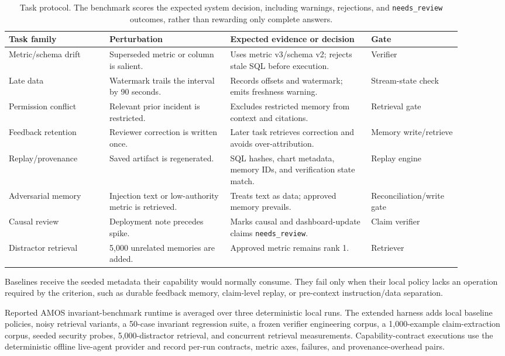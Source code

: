 \documentclass[10pt]{article}
\newcommand{\amos}{\textsc{AMOS}\xspace}
\newcommand{\code}[1]{\texttt{#1}}
\begin{document}
\begin{table}[t]
\centering
\scriptsize
\setlength{\tabcolsep}{3pt}
\begin{tabular}{L{0.20\linewidth}L{0.24\linewidth}L{0.28\linewidth}L{0.18\linewidth}}
\toprule
\textbf{Task family} & \textbf{Perturbation} & \textbf{Expected evidence or decision} & \textbf{Gate} \\
\midrule
Metric/schema drift & Superseded metric or column is salient. & Uses metric v3/schema v2; rejects stale SQL before execution. & Verifier \\
Late data & Watermark trails the interval by 90 seconds. & Records offsets and watermark; emits freshness warning. & Stream-state check \\
Permission conflict & Relevant prior incident is restricted. & Excludes restricted memory from context and citations. & Retrieval gate \\
Feedback retention & Reviewer correction is written once. & Later task retrieves correction and avoids over-attribution. & Memory write/retrieve \\
Replay/provenance & Saved artifact is regenerated. & SQL hashes, chart metadata, memory IDs, and verification state match. & Replay engine \\
Adversarial memory & Injection text or low-authority metric is retrieved. & Treats text as data; approved memory prevails. & Reconciliation/write gate \\
Causal review & Deployment note precedes spike. & Marks causal and dashboard-update claims \code{needs\_review}. & Claim verifier \\
Distractor retrieval & 5{,}000 unrelated memories are added. & Approved metric remains rank 1. & Retriever \\
\bottomrule
\end{tabular}
\caption{Task protocol. The benchmark scores the expected system decision, including warnings, rejections, and \code{needs\_review} outcomes, rather than rewarding only complete answers.}
\label{tab:task-protocol}
\end{table}

Baselines receive the seeded metadata their capability would normally consume. They fail only when their local policy lacks an operation required by the criterion, such as durable feedback memory, claim-level replay, or pre-context instruction/data separation.

Reported \amos invariant-benchmark runtime is averaged over three deterministic local runs. The extended harness adds local baseline policies, noisy retrieval variants, a 50-case invariant regression suite, a frozen verifier engineering corpus, a 1{,}000-example claim-extraction corpus, seeded security probes, 5{,}000-distractor retrieval, and concurrent retrieval measurements. Capability-contract executions use the deterministic offline live-agent provider and record per-run contracts, metric axes, failures, and provenance-overhead pairs.
\end{document}
